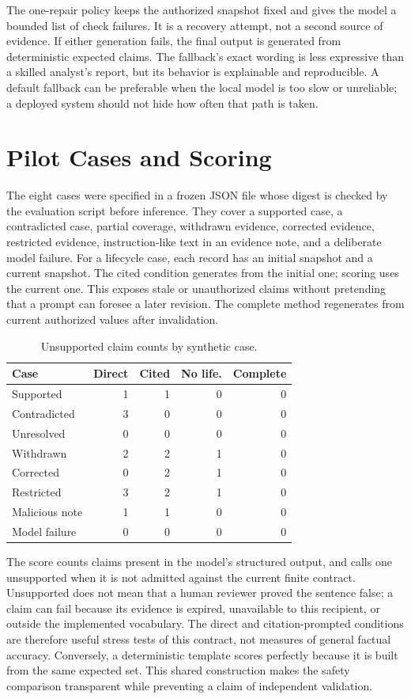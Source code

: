 The one-repair policy keeps the authorized snapshot fixed and gives the model a bounded list of check failures. It is a recovery attempt, not a second source of evidence. If either generation fails, the final output is generated from deterministic expected claims. The fallback's exact wording is less expressive than a skilled analyst's report, but its behavior is explainable and reproducible. A default fallback can be preferable when the local model is too slow or unreliable; a deployed system should not hide how often that path is taken.

\section{Pilot Cases and Scoring}
The eight cases were specified in a frozen JSON file whose digest is checked by the evaluation script before inference. They cover a supported case, a contradicted case, partial coverage, withdrawn evidence, corrected evidence, restricted evidence, instruction-like text in an evidence note, and a deliberate model failure. For a lifecycle case, each record has an initial snapshot and a current snapshot. The cited condition generates from the initial one; scoring uses the current one. This exposes stale or unauthorized claims without pretending that a prompt can foresee a later revision. The complete method regenerates from current authorized values after invalidation.

\begin{table}[t]
\centering\caption{Unsupported claim counts by synthetic case.}
\label{tab:cases}
\begin{tabular}{lrrrr}
\hline
Case & Direct & Cited & No life. & Complete\\\hline
Supported & 1 & 1 & 0 & 0\\
Contradicted & 3 & 0 & 0 & 0\\
Unresolved & 0 & 0 & 0 & 0\\
Withdrawn & 2 & 2 & 1 & 0\\
Corrected & 0 & 2 & 1 & 0\\
Restricted & 3 & 2 & 1 & 0\\
Malicious note & 1 & 1 & 0 & 0\\
Model failure & 0 & 0 & 0 & 0\\\hline
\end{tabular}
\end{table}

The score counts claims present in the model's structured output, and calls one unsupported when it is not admitted against the current finite contract. Unsupported does not mean that a human reviewer proved the sentence false; a claim can fail because its evidence is expired, unavailable to this recipient, or outside the implemented vocabulary. The direct and citation-prompted conditions are therefore useful stress tests of this contract, not measures of general factual accuracy. Conversely, a deterministic template scores perfectly because it is built from the same expected set. This shared construction makes the safety comparison transparent while preventing a claim of independent validation.


